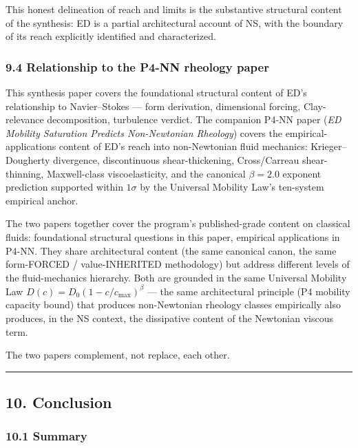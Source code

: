 \documentclass[
]{article}
\begin{document}
This honest delineation of reach and limits is the substantive
structural content of the synthesis: ED is a partial architectural
account of NS, with the boundary of its reach explicitly identified and
characterized.

\subsubsection{9.4 Relationship to the P4-NN rheology
paper}\label{relationship-to-the-p4-nn-rheology-paper}

This synthesis paper covers the foundational structural content of ED's
relationship to Navier--Stokes --- form derivation, dimensional forcing,
Clay-relevance decomposition, turbulence verdict. The companion P4-NN
paper (\emph{ED Mobility Saturation Predicts Non-Newtonian Rheology})
covers the empirical-applications content of ED's reach into
non-Newtonian fluid mechanics: Krieger--Dougherty divergence,
discontinuous shear-thickening, Cross/Carreau shear-thinning,
Maxwell-class viscoelasticity, and the canonical \(\beta = 2.0\)
exponent prediction supported within \(1\sigma\) by the Universal
Mobility Law's ten-system empirical anchor.

The two papers together cover the program's published-grade content on
classical fluids: foundational structural questions in this paper,
empirical applications in P4-NN. They share architectural content (the
same canonical canon, the same form-FORCED / value-INHERITED
methodology) but address different levels of the fluid-mechanics
hierarchy. Both are grounded in the same Universal Mobility Law
\(D(c) = D_0(1 - c/c_\mathrm{max})^\beta\) --- the same architectural
principle (P4 mobility capacity bound) that produces non-Newtonian
rheology classes empirically also produces, in the NS context, the
dissipative content of the Newtonian viscous term.

The two papers complement, not replace, each other.

\begin{center}\rule{0.5\linewidth}{0.5pt}\end{center}

\subsection{10. Conclusion}\label{conclusion}

\subsubsection{10.1 Summary}\label{summary}
\end{document}
